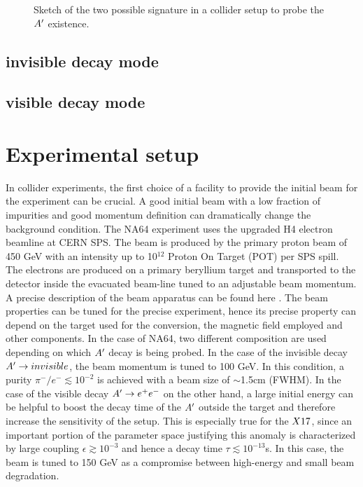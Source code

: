 \begin{figure}[bth!]
  \centering
  
  \caption[two signature sketch]{Sketch of the two possible signature in a collider setup to probe the $A'$ existence.}
  \label{fig:two-signature}
\end{figure}

\subsection{invisible decay mode}
\label{ch2:sec:experimental-technique-invis}

\subsection{visible decay mode}
\label{ch2:sec:experimental-technique-vis}

\section{Experimental setup}
\label{ch2:sec:experimental-setup}

In collider experiments, the first choice of a facility to provide the initial beam for the experiment can be crucial. A good initial beam with a low fraction of impurities and good momentum definition can dramatically change the background condition. The NA64 experiment uses the upgraded H4 electron beamline at CERN SPS. The beam is produced by the primary proton beam of 450 \si{\giga\electronvolt} with an intensity up to 10$^{12}$ Proton On Target (POT) per SPS spill. The electrons are produced on a primary beryllium target and transported to the detector inside the evacuated beam-line tuned to an adjustable beam momentum. A precise description of the beam apparatus can be found here \cite{sps-beamline,h4-beamline}. The beam properties can be tuned for the precise experiment, hence its precise property can depend on the target used for the conversion, the magnetic field employed and other components. In the case of NA64, two different composition are used depending on which $A'$ decay is being probed. In the case of the invisible decay $A'\to invisible$, the beam momentum is tuned to 100 \si{\giga\electronvolt}. In this condition, a purity $\pi^-/e^- \lesssim 10^{-2}$ is achieved with a beam size of $\sim$1.5\si{cm} (FWHM). In the case of the visible decay $A' \to e^+e^-$ on the other hand, a large initial energy can be helpful to boost the decay time of the $A'$ outside the target and therefore increase the sensitivity of the setup. This is especially true for the $X17$, since an important portion of the parameter space justifying this anomaly is characterized by large coupling $\epsilon \gtrsim 10^{-3}$ and hence a decay time $\tau \lesssim 10^{-13}$\si{s}. In this case, the beam is tuned to 150 \si{\giga\electronvolt} as a compromise between high-energy and small beam degradation.

